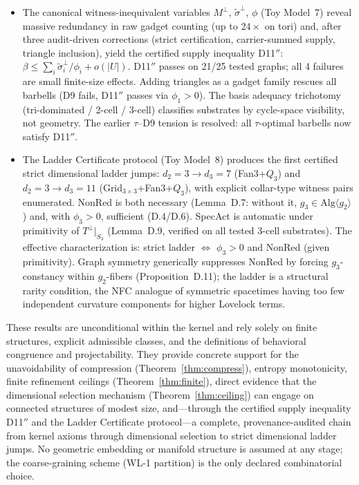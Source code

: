 \documentclass[11pt,a4paper]{article}
\theoremstyle{definition}
\theoremstyle{remark}
\begin{document}
\begin{itemize}[nosep]
  \item The canonical witness-inequivalent variables $M^\perp$, $\tilde\sigma^\perp$, $\phi$ (Toy Model~7) reveal massive redundancy in raw gadget counting (up to $24\times$ on tori) and, after three audit-driven corrections (strict certification, carrier-summed supply, triangle inclusion), yield the certified supply inequality D11$''$: $\beta \leq \sum_i \tilde\sigma_i^\perp / \phi_i + o(|U|)$. D11$''$ passes on 21/25 tested graphs; all 4 failures are small finite-size effects. Adding triangles as a gadget family rescues all barbells (D9 fails, D11$''$ passes via $\phi_1 > 0$). The basis adequacy trichotomy (tri-dominated / 2-cell / 3-cell) classifies substrates by cycle-space visibility, not geometry. The earlier $\tau$--D9 tension is resolved: all $\tau$-optimal barbells now satisfy D11$''$.
  \item The Ladder Certificate protocol (Toy Model~8) produces the first certified strict dimensional ladder jumps: $d_2 = 3 \to d_3 = 7$ (Fan3+$Q_3$) and $d_2 = 3 \to d_3 = 11$ (Grid$_{3\times3}$+Fan3+$Q_3$), with explicit collar-type witness pairs enumerated. NonRed is both necessary (Lemma~D.7: without it, $g_3 \in \mathrm{Alg}\langle g_2\rangle$) and, with $\phi_3 > 0$, sufficient (D.4/D.6). SpecAct is automatic under primitivity of $T^\perp|_{S_3}$ (Lemma~D.9, verified on all tested 3-cell substrates). The effective characterization is: strict ladder $\iff$ $\phi_3 > 0$ and NonRed (given primitivity). Graph symmetry generically suppresses NonRed by forcing $g_3$-constancy within $g_2$-fibers (Proposition~D.11); the ladder is a structural rarity condition, the NFC analogue of symmetric spacetimes having too few independent curvature components for higher Lovelock terms.
\end{itemize}

These results are unconditional within the kernel and rely solely on finite structures, explicit admissible classes, and the definitions of behavioral congruence and projectability. They provide concrete support for the unavoidability of compression (Theorem~\ref{thm:compress}), entropy monotonicity, finite refinement ceilings (Theorem~\ref{thm:finite}), direct evidence that the dimensional selection mechanism (Theorem~\ref{thm:ceiling}) can engage on connected structures of modest size, and---through the certified supply inequality D11$''$ and the Ladder Certificate protocol---a complete, provenance-audited chain from kernel axioms through dimensional selection to strict dimensional ladder jumps. No geometric embedding or manifold structure is assumed at any stage; the coarse-graining scheme (WL-1 partition) is the only declared combinatorial choice.
\end{document}
